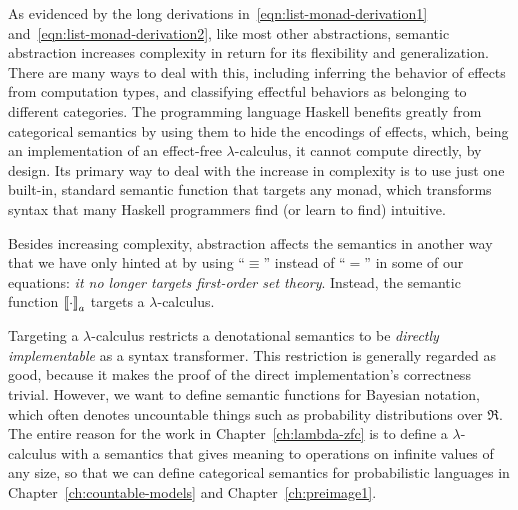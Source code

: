 As evidenced by the long derivations in~\eqref{eqn:list-monad-derivation1} and~\eqref{eqn:list-monad-derivation2}, like most other abstractions, semantic abstraction increases complexity in return for its flexibility and generalization.
There are many ways to deal with this, including inferring the behavior of effects from computation types, and classifying effectful behaviors as belonging to different categories.
The programming language Haskell benefits greatly from categorical semantics by using them to hide the encodings of effects, which, being an implementation of an effect-free $\lambda$-calculus, it cannot compute directly, by design.
Its primary way to deal with the increase in complexity is to use just one built-in, standard semantic function that targets any monad, which transforms syntax that many Haskell programmers find (or learn to find) intuitive.

Besides increasing complexity, abstraction affects the semantics in another way that we have only hinted at by using ``$\equiv$'' instead of ``$=$'' in some of our equations: \emph{it no longer targets first-order set theory}.
Instead, the semantic function $\left\llbracket{\cdot}\right\rrbracket_a$ targets a $\lambda$-calculus.

Targeting a $\lambda$-calculus restricts a denotational semantics to be \emph{directly implementable} as a syntax transformer.
This restriction is generally regarded as good, because it makes the proof of the direct implementation's correctness trivial.
However, we want to define semantic functions for Bayesian notation, which often denotes uncountable things such as probability distributions over $\Re$.
The entire reason for the work in Chapter~\ref{ch:lambda-zfc} is to define a $\lambda$-calculus with a semantics that gives meaning to operations on infinite values of any size, so that we can define categorical semantics for probabilistic languages in Chapter~\ref{ch:countable-models} and Chapter~\ref{ch:preimage1}.

